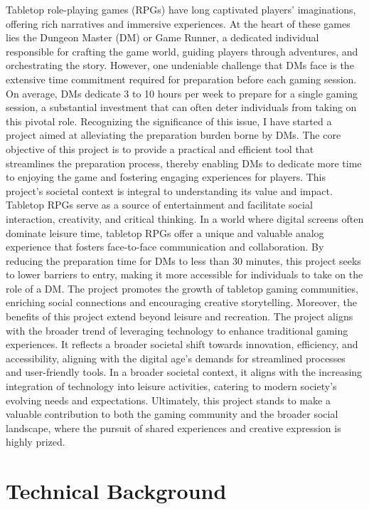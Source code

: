 \documentclass[10pt,twocolumn]{article}
\begin{document}
Tabletop role-playing games (RPGs) have long captivated players' imaginations, offering rich narratives and immersive experiences. At the heart of these games lies the Dungeon Master (DM) or Game Runner, a dedicated individual responsible for crafting the game world, guiding players through adventures, and orchestrating the story. However, one undeniable challenge that DMs face is the extensive time commitment required for preparation before each gaming session. On average, DMs dedicate 3 to 10 hours per week\cite{quora_dnd_duration} \cite{reddit_dnd_prep}to prepare for a single gaming session, a substantial investment that can often deter individuals from taking on this pivotal role.
Recognizing the significance of this issue, I have started a project aimed at alleviating the preparation burden borne by DMs. The core objective of this project is to provide a practical and efficient tool that streamlines the preparation process, thereby enabling DMs to dedicate more time to enjoying the game and fostering engaging experiences for players.
This project's societal context is integral to understanding its value and impact. Tabletop RPGs serve as a source of entertainment and facilitate social interaction, creativity, and critical thinking. In a world where digital screens often dominate leisure time, tabletop RPGs offer a unique and valuable analog experience that fosters face-to-face communication and collaboration. By reducing the preparation time for DMs to less than 30 minutes, this project seeks to lower barriers to entry, making it more accessible for individuals to take on the role of a DM. The project promotes the growth of tabletop gaming communities, enriching social connections and encouraging creative storytelling.
Moreover, the benefits of this project extend beyond leisure and recreation. The project aligns with the broader trend of leveraging technology to enhance traditional gaming experiences. It reflects a broader societal shift towards innovation, efficiency, and accessibility, aligning with the digital age's demands for streamlined processes and user-friendly tools.
 In a broader societal context, it aligns with the increasing integration of technology into leisure activities, catering to modern society's evolving needs and expectations. Ultimately, this project stands to make a valuable contribution to both the gaming community and the broader social landscape, where the pursuit of shared experiences and creative expression is highly prized.


\section{Technical Background}
\end{document}
